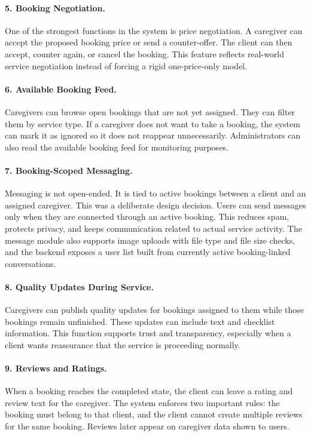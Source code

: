 \documentclass[12pt,a4paper]{article}
\begin{document}
\paragraph{5. Booking Negotiation.}
One of the strongest functions in the system is price negotiation. A caregiver can accept the proposed booking price or send a counter-offer. The client can then accept, counter again, or cancel the booking. This feature reflects real-world service negotiation instead of forcing a rigid one-price-only model.

\paragraph{6. Available Booking Feed.}
Caregivers can browse open bookings that are not yet assigned. They can filter them by service type. If a caregiver does not want to take a booking, the system can mark it as ignored so it does not reappear unnecessarily. Administrators can also read the available booking feed for monitoring purposes.

\paragraph{7. Booking-Scoped Messaging.}
Messaging is not open-ended. It is tied to active bookings between a client and an assigned caregiver. This was a deliberate design decision. Users can send messages only when they are connected through an active booking. This reduces spam, protects privacy, and keeps communication related to actual service activity. The message module also supports image uploads with file type and file size checks, and the backend exposes a user list built from currently active booking-linked conversations.

\paragraph{8. Quality Updates During Service.}
Caregivers can publish quality updates for bookings assigned to them while those bookings remain unfinished. These updates can include text and checklist information. This function supports trust and transparency, especially when a client wants reassurance that the service is proceeding normally.

\paragraph{9. Reviews and Ratings.}
When a booking reaches the completed state, the client can leave a rating and review text for the caregiver. The system enforces two important rules: the booking must belong to that client, and the client cannot create multiple reviews for the same booking. Reviews later appear on caregiver data shown to users.
\end{document}

